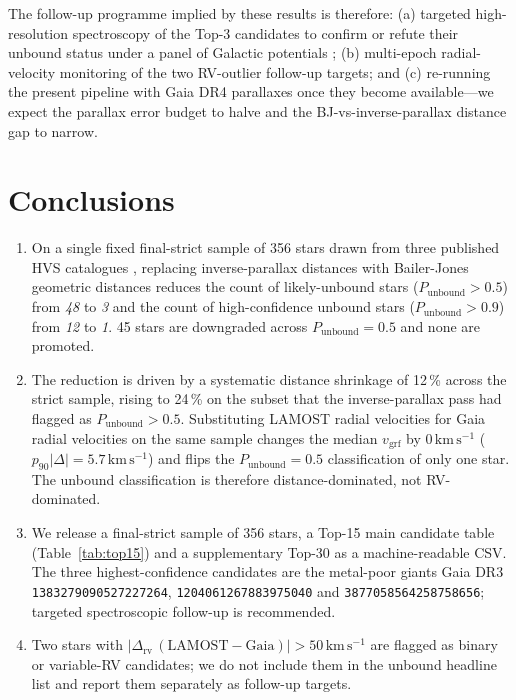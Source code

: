 \documentclass{caosp310}
\newcommand{\vgrf}{v_{\mathrm{grf}}}
\newcommand{\Punb}{P_{\mathrm{unbound}}}
\newcommand{\kmps}{\ensuremath{\,\mathrm{km}\,\mathrm{s}^{-1}}}
\begin{document}
The follow-up programme implied by these results is therefore: (a)
targeted high-resolution spectroscopy of the Top-3 candidates to confirm
or refute their unbound status under a panel of Galactic potentials
\citep[e.g.][]{McMillan2017MWMass,Piffl2014RAVEvesc,Monari2018Vesc};
(b) multi-epoch radial-velocity monitoring of the two RV-outlier
follow-up targets; and (c) re-running the present pipeline with Gaia DR4
parallaxes once they become available---we expect the parallax error
budget to halve and the BJ-vs-inverse-parallax distance gap to narrow.

\section{Conclusions}
\label{sec:conclusions}

\begin{enumerate}
  \item On a single fixed final-strict sample of 356 stars drawn from
        three published HVS catalogues
        \citep{Li2021HVS591,Li2023ExtremeVelocity88,Liao2024HVS519},
        replacing inverse-parallax distances with Bailer-Jones geometric
        distances reduces the count of likely-unbound stars
        ($\Punb>0.5$) from \emph{48} to \emph{3} and the count of
        high-confidence unbound stars ($\Punb>0.9$) from \emph{12} to
        \emph{1}. 45 stars are downgraded across $\Punb=0.5$ and none
        are promoted.
  \item The reduction is driven by a systematic distance shrinkage
        of 12\,\% across the strict sample, rising to 24\,\% on the
        subset that the inverse-parallax pass had flagged as $\Punb>0.5$.
        Substituting LAMOST radial velocities for Gaia radial velocities
        on the same sample changes the median $\vgrf$ by $0\kmps$
        ($p_{90}|\Delta|=5.7\kmps$) and flips the $\Punb=0.5$
        classification of only one star. The unbound classification is
        therefore distance-dominated, not RV-dominated.
  \item We release a final-strict sample of 356 stars, a Top-15 main
        candidate table (Table~\ref{tab:top15}) and a supplementary
        Top-30 as a machine-readable CSV. The three highest-confidence
        candidates are the metal-poor giants Gaia DR3
        \texttt{1383279090527227264},\allowbreak{}
        \texttt{1204061267883975040}\allowbreak{} and
        \texttt{3877058564258758656}; targeted spectroscopic follow-up
        is recommended.
  \item Two stars with
        $|\Delta_{\mathrm{rv}}\,(\mathrm{LAMOST}-\mathrm{Gaia})|>50\kmps$
        are flagged as binary or variable-RV candidates; we do not
        include them in the unbound headline list and report them
        separately as follow-up targets.
\end{enumerate}
\end{document}
